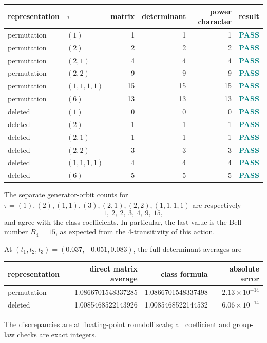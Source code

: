 \documentclass[10pt]{article}
\begin{document}
\begin{center}
\begin{tabular}{@{}llrrrc@{}}
\toprule
representation & $\tau$ & matrix & determinant & power character & result\\
\midrule
permutation & $(1)$ & 1 & 1 & 1 & \textcolor{teal}{\textbf{PASS}}\\
permutation & $(2)$ & 2 & 2 & 2 & \textcolor{teal}{\textbf{PASS}}\\
permutation & $(2,1)$ & 4 & 4 & 4 & \textcolor{teal}{\textbf{PASS}}\\
permutation & $(2,2)$ & 9 & 9 & 9 & \textcolor{teal}{\textbf{PASS}}\\
permutation & $(1,1,1,1)$ & 15 & 15 & 15 & \textcolor{teal}{\textbf{PASS}}\\
permutation & $(6)$ & 13 & 13 & 13 & \textcolor{teal}{\textbf{PASS}}\\
\addlinespace
deleted & $(1)$ & 0 & 0 & 0 & \textcolor{teal}{\textbf{PASS}}\\
deleted & $(2)$ & 1 & 1 & 1 & \textcolor{teal}{\textbf{PASS}}\\
deleted & $(2,1)$ & 1 & 1 & 1 & \textcolor{teal}{\textbf{PASS}}\\
deleted & $(2,2)$ & 3 & 3 & 3 & \textcolor{teal}{\textbf{PASS}}\\
deleted & $(1,1,1,1)$ & 4 & 4 & 4 & \textcolor{teal}{\textbf{PASS}}\\
deleted & $(6)$ & 5 & 5 & 5 & \textcolor{teal}{\textbf{PASS}}\\
\bottomrule
\end{tabular}
\end{center}

The separate generator-orbit counts for
$\tau=(1),(2),(1,1),(3),(2,1),(2,2),(1,1,1,1)$ are respectively
\[
1,\ 2,\ 2,\ 3,\ 4,\ 9,\ 15,
\]
and agree with the class coefficients.  In particular, the last value is the
Bell number $B_4=15$, as expected from the 4-transitivity of this action.

At $(t_1,t_2,t_3)=(0.037,-0.051,0.083)$, the full determinant averages are
\begin{center}
\begin{tabular}{@{}lrrr@{}}
\toprule
representation & direct matrix average & class formula & absolute error\\
\midrule
permutation & 1.0866701548337285 & 1.0866701548337498 & $2.13\times10^{-14}$\\
deleted & 1.0085468522143926 & 1.0085468522144532 & $6.06\times10^{-14}$\\
\bottomrule
\end{tabular}
\end{center}
The discrepancies are at floating-point roundoff scale; all coefficient and
group-law checks are exact integers.
\end{document}
